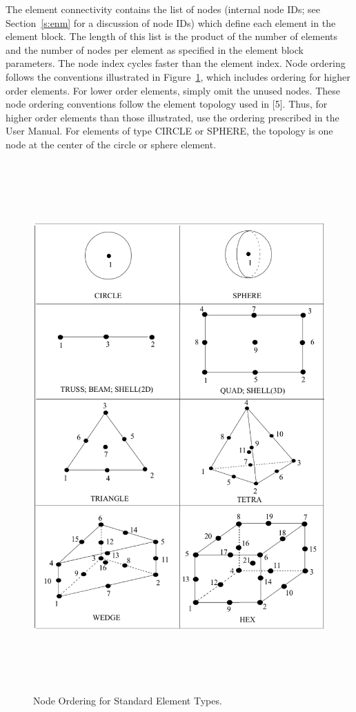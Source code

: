 The element connectivity contains the list of nodes (internal node
IDs; see Section~\ref{s:enm} for a discussion of node IDs) which
define each element in the element block. The length of this list is
the product of the number of elements and the number of nodes per
element as specified in the element block parameters. The node index
cycles faster than the element index. Node ordering follows the
conventions illustrated in Figure~\ref{f:NodeOrdering}, which includes ordering for
higher order elements. For lower order elements, simply omit the
unused nodes. These node ordering conventions follow the element
topology used in  [5]. Thus, for higher order elements than
those illustrated, use the ordering prescribed in the  User
Manual. For elements of type CIRCLE or SPHERE, the topology is one
node at the center of the circle or sphere element.
\begin{figure}[htbp]
\begin{center}
\includegraphics[width=6.250in, height=8.000in]{figures/NodeOrdering.png}
\caption{Node Ordering for Standard Element Types.}\label{f:NodeOrdering}
\end{center}
\end{figure}

